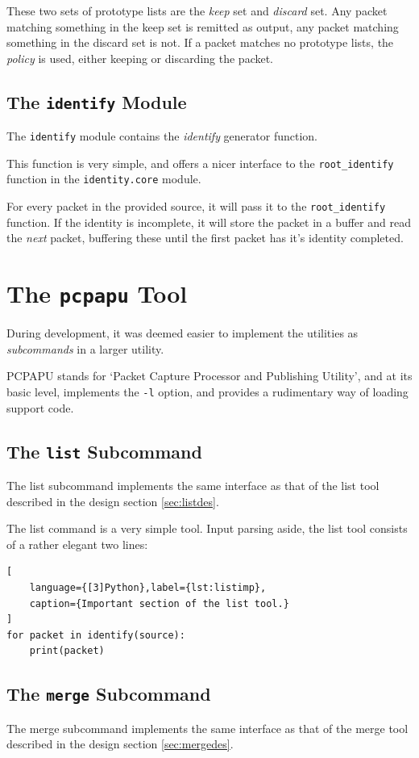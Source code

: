 \documentclass[10pt,a4paper,notitlepage]{report}
\begin{document}
These two sets of prototype lists are the \emph{keep} set and \emph{discard} set.
Any packet matching something in the keep set is remitted as output, any packet matching something in the discard set is not. If a packet matches no prototype lists, the \emph{policy} is used, either keeping or discarding the packet.

\subsection{The \texttt{identify} Module}
The \texttt{identify} module contains the \emph{identify} generator function.

This function is very simple, and offers a nicer interface to the \texttt{root_identify} function in the \texttt{identity.core} module.

For every packet in the provided source, it will pass it to the \texttt{root_identify} function. If the identity is incomplete, it will store the packet in a buffer and read the \emph{next} packet, buffering these until the first packet has it's identity completed.

\section{The \texttt{pcpapu} Tool}
During development, it was deemed easier to implement the utilities as \emph{subcommands} in a larger utility.

PCPAPU stands for `Packet Capture Processor and Publishing Utility', and at its basic level, implements the \texttt{-l} option, and provides a rudimentary way of loading support code.

\subsection{The \texttt{list} Subcommand}
The list subcommand implements the same interface as that of the list tool described in the design section \ref{sec:listdes}.

The list command is a very simple tool. Input parsing aside, the list tool consists of a rather elegant two lines:
\begin{lstlisting}[
	language={[3]Python},label={lst:listimp},
	caption={Important section of the list tool.}
]
for packet in identify(source):
    print(packet)
\end{lstlisting}

\subsection{The \texttt{merge} Subcommand}
The merge subcommand implements the same interface as that of the merge tool described in the design section \ref{sec:mergedes}.
\end{document}
